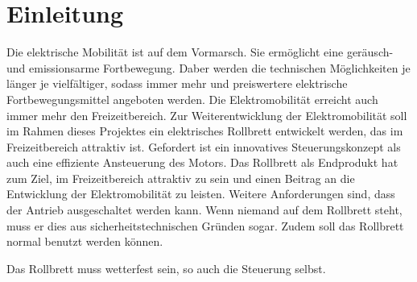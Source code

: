 \chapter{Einleitung}
Die elektrische Mobilität ist auf dem Vormarsch. Sie ermöglicht eine geräusch- und emissionsarme Fortbewegung. Daber werden die technischen Möglichkeiten je länger je vielfältiger, sodass immer mehr und preiswertere elektrische Fortbewegungsmittel angeboten werden.
Die Elektromobilität erreicht auch immer mehr den Freizeitbereich.
Zur Weiterentwicklung der Elektromobilität soll im Rahmen dieses Projektes ein elektrisches Rollbrett entwickelt werden, das im Freizeitbereich attraktiv ist.
Gefordert ist ein innovatives Steuerungskonzept als auch eine effiziente Ansteuerung des Motors. Das Rollbrett als Endprodukt hat zum Ziel, im Freizeitbereich attraktiv zu sein und einen Beitrag an die Entwicklung der Elektromobilität zu leisten. Weitere Anforderungen sind, dass der Antrieb ausgeschaltet werden kann. Wenn niemand auf dem Rollbrett steht, muss er dies aus sicherheitstechnischen Gründen sogar. Zudem soll das Rollbrett normal benutzt werden können. 

Das Rollbrett muss wetterfest sein, so auch die Steuerung selbst. 

